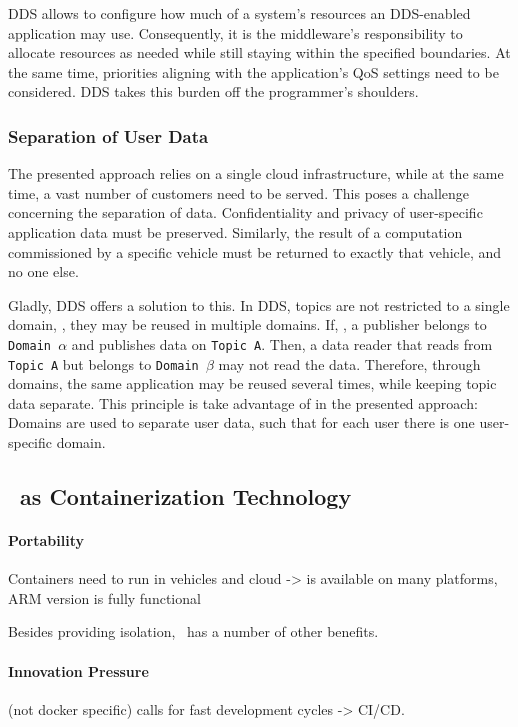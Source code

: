 DDS allows to configure how much of a system's resources an DDS-enabled application may use. Consequently, it is the middleware's responsibility to allocate resources as needed while still staying within the specified boundaries. At the same time, priorities aligning with the application's QoS settings need to be considered. DDS takes this burden off the programmer's shoulders.



\subsubsection{Separation of User Data}
The presented approach relies on a single cloud infrastructure, while at the same time, a vast number of customers need to be served. This poses a challenge concerning the separation of data. Confidentiality and privacy of user-specific application data must be preserved. Similarly, the result of a computation commissioned by a specific vehicle must be returned to exactly that vehicle, and no one else. 

Gladly, DDS offers a solution to this. In DDS, topics are not restricted to a single domain, \ie , they may be reused in multiple domains. If, \eg , a publisher belongs to \texttt{Domain $\alpha$} and publishes data on \texttt{Topic A}. Then, a data reader that reads from \texttt{Topic A} but belongs to \texttt{Domain $\beta$} may not read the data. Therefore, through domains, the same application may be reused several times, while keeping topic data separate. This principle is take advantage of in the presented approach: Domains are used to separate user data, such that for each user there is one user-specific domain.




\subsection{\docker\ as Containerization Technology}

\paragraph{Portability} Containers need to run in vehicles and cloud -> \docker is available on many platforms, ARM version is fully functional

Besides providing isolation, \docker\ has a number of other benefits. 
\paragraph{Innovation Pressure}(not docker specific) calls for fast development cycles -> CI/CD.

